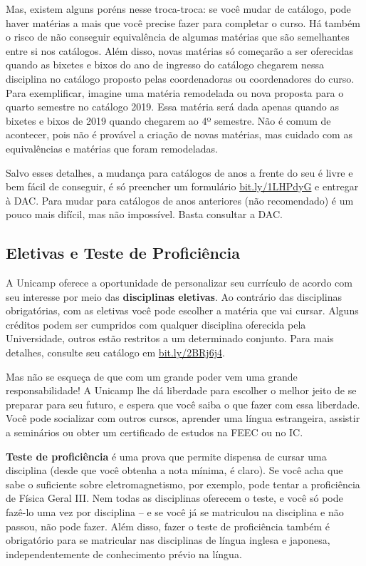 Mas, existem alguns poréns nesse troca-troca: se você mudar de catálogo, pode
haver matérias a mais que você precise fazer para completar o curso. Há também
o risco de não conseguir equivalência de algumas matérias que são semelhantes
entre si nos catálogos. Além disso, novas matérias só começarão a ser
oferecidas quando as bixetes e bixos do ano de ingresso do catálogo chegarem
nessa disciplina no catálogo proposto pelas coordenadoras ou coordenadores do
curso. Para exemplificar, imagine uma matéria remodelada ou nova proposta para
o quarto semestre no catálogo 2019. Essa matéria será dada apenas quando as
bixetes e bixos de 2019 quando chegarem ao 4º semestre. Não é comum de
acontecer, pois não é provável a criação de novas matérias, mas cuidado com as
equivalências e matérias que foram remodeladas.

Salvo esses detalhes, a mudança para catálogos de anos a frente do seu é livre
e bem fácil de conseguir, é só preencher um formulário \url{bit.ly/1LHPdyG} e
entregar à DAC. Para mudar para catálogos de anos anteriores (não recomendado)
é um pouco mais difícil, mas não impossível. Basta consultar a DAC.

\subsection{Eletivas e Teste de Proficiência}

A Unicamp oferece a oportunidade de personalizar seu currículo de acordo com
seu interesse por meio das \textbf{disciplinas eletivas}. Ao contrário das
disciplinas obrigatórias, com as eletivas você pode escolher a matéria que vai
cursar. Alguns créditos podem ser cumpridos com qualquer disciplina oferecida
pela Universidade, outros estão restritos a um determinado conjunto. Para mais
detalhes, consulte seu catálogo em \url{bit.ly/2BRj6j4}.

Mas não se esqueça de que com um grande poder vem uma grande responsabilidade!
A Unicamp lhe dá liberdade para escolher o melhor jeito de se preparar para seu
futuro, e espera que você saiba o que fazer com essa liberdade. Você pode
socializar com outros cursos, aprender uma língua estrangeira, assistir a
seminários ou obter um certificado de estudos na FEEC ou no IC.

\textbf{Teste de proficiência} é uma prova que permite dispensa de cursar uma
disciplina (desde que você obtenha a nota mínima, é claro). Se você acha que
sabe o suficiente sobre eletromagnetismo, por exemplo, pode tentar a
proficiência de Física Geral III. Nem todas as disciplinas oferecem o teste, e
você só pode fazê-lo uma vez por disciplina -- e se você já se matriculou na
disciplina e não passou, não pode fazer. Além disso, fazer o teste de
proficiência também é obrigatório para se matricular nas disciplinas de língua
inglesa e japonesa, independentemente de conhecimento prévio na língua.

